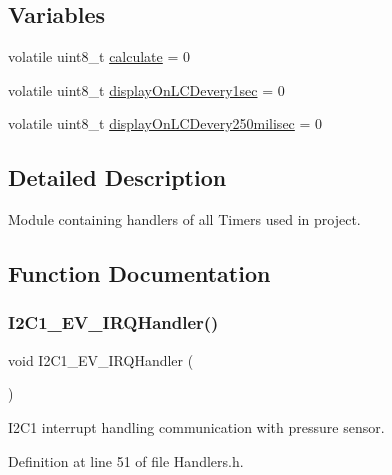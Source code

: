 \subsection*{Variables}
\begin{DoxyCompactItemize}
\item 
volatile uint8\+\_\+t \mbox{\hyperlink{group___handlers_ga31b840eb0bc7dbaaf882425d21292c4e_ga31b840eb0bc7dbaaf882425d21292c4e}{calculate}} = 0
\item 
volatile uint8\+\_\+t \mbox{\hyperlink{group___handlers_ga562013b342dd86247a6939ec1da5a52e_ga562013b342dd86247a6939ec1da5a52e}{display\+On\+L\+C\+Devery1sec}} = 0
\item 
volatile uint8\+\_\+t \mbox{\hyperlink{group___handlers_ga859225fb2b0f2a730346fa92e3b7fe9b_ga859225fb2b0f2a730346fa92e3b7fe9b}{display\+On\+L\+C\+Devery250milisec}} = 0
\end{DoxyCompactItemize}


\subsection{Detailed Description}
Module containing handlers of all Timers used in project. 



\subsection{Function Documentation}
\mbox{\label{group___handlers_gad0e17b57fe51ed2861178f06899345c0_gad0e17b57fe51ed2861178f06899345c0}} 
\subsubsection{\texorpdfstring{I2C1\_EV\_IRQHandler()}{I2C1\_EV\_IRQHandler()}}
{\footnotesize\ttfamily void I2\+C1\+\_\+\+E\+V\+\_\+\+I\+R\+Q\+Handler (\begin{DoxyParamCaption}{ }\end{DoxyParamCaption})}



I2\+C1 interrupt handling communication with pressure sensor. 



Definition at line 51 of file Handlers.\+h.

